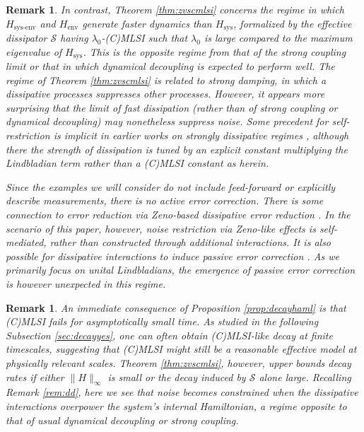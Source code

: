 \documentclass[accepted=2026-02-01, letterpaper]{quantumarticle}
\newtheorem{rem}[lemma]{Remark}
\renewcommand{\S}{\mathcal{S}}
\newcommand{\Ha}{H}
\begin{document}
\begin{rem}
In contrast, Theorem \ref{thm:zvscmlsi} concerns the regime in which $\Ha_{\text{sys-env}}$ and $\Ha_{\text{env}}$ generate faster dynamics than $\Ha_{\text{sys}}$, formalized by the effective dissipator $\S$ having $\lambda_0$-(C)MLSI such that $\lambda_0$ is large compared to the maximum eigenvalue of $\Ha_{\text{sys}}$. This is the opposite regime from that of the strong coupling limit or that in which dynamical decoupling is expected to perform well. The regime of Theorem \ref{thm:zvscmlsi} is related to strong damping, in which a dissipative processes suppresses other processes. However, it appears more surprising that the limit of fast dissipation (rather than of strong coupling or dynamical decoupling) may nonetheless suppress noise. Some precedent for self-restriction is implicit in earlier works on strongly dissipative regimes \cite{zanardi_coherent_2014, popkov_effective_2018}, although there the strength of dissipation is tuned by an explicit constant multiplying the Lindbladian term rather than a (C)MLSI constant as herein.

Since the examples we will consider do not include feed-forward or explicitly describe measurements, there is no active error correction. There is some connection to error reduction via Zeno-based dissipative error reduction \cite{beige_quantum_2000}. In the scenario of this paper, however, noise restriction via Zeno-like effects is self-mediated, rather than constructed through additional interactions. It is also possible for dissipative interactions to induce passive error correction \cite{liu_dissipative_2024}. As we primarily focus on unital Lindbladians, the emergence of passive error correction is however unexpected in this regime.
\end{rem}
\begin{rem} \normalfont
An immediate consequence of Proposition \ref{prop:decayhaml} is that (C)MLSI fails for asymptotically small time. As studied in the following Subsection \ref{sec:decayyes}, one can often obtain (C)MLSI-like decay at finite timescales, suggesting that (C)MLSI might still be a reasonable effective model at physically relevant scales. Theorem \ref{thm:zvscmlsi}, however, upper bounds decay rates if either  $\|\Ha\|_\infty$ is small or the decay induced by $\S$ alone large. Recalling Remark \ref{rem:dd}, here we see that noise becomes constrained when the dissipative interactions overpower the system's internal Hamiltonian, a regime \textit{opposite} to that of usual dynamical decoupling or strong coupling.
\end{rem}
\end{document}
